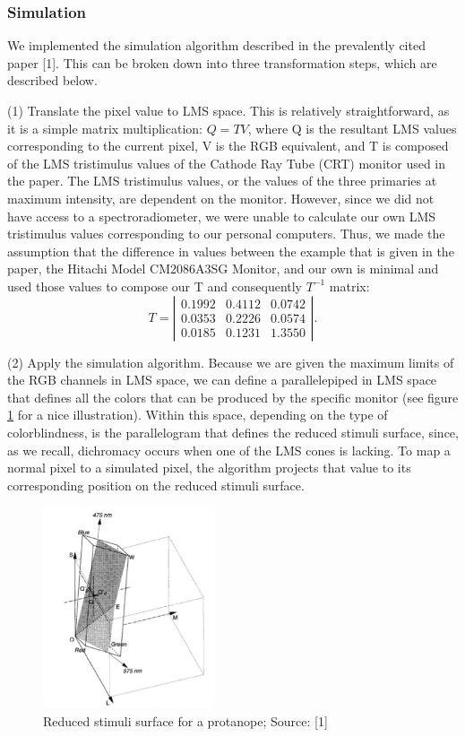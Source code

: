\documentclass[10pt,twocolumn,letterpaper]{article}
\begin{document}
\subsubsection{Simulation}

We implemented the simulation algorithm described in the prevalently cited paper [1]. This can be broken down into three transformation steps, which are described below.

(1) Translate the pixel value to LMS space. This is relatively straightforward, as it is a simple matrix multiplication: $Q = TV$, where Q is the resultant LMS values corresponding to the current pixel, V is the RGB equivalent, and T is composed of the LMS tristimulus values of the Cathode Ray Tube (CRT) monitor used in the paper. The LMS tristimulus values, or the values of the three primaries at maximum intensity, are dependent on the monitor. However, since we did not have access to a spectroradiometer, we were unable to calculate our own LMS tristimulus values corresponding to our personal computers. Thus, we made the assumption that the difference in values between the example that is given in the paper, the Hitachi Model CM2086A3SG Monitor, and our own is minimal and used those values to compose our T and consequently $T^{-1}$ matrix: 
\[ T = \left| \begin{array}{ccc}
0.1992 & 0.4112 & 0.0742 \\
0.0353 & 0.2226 & 0.0574 \\
0.0185 & 0.1231 & 1.3550 \end{array} \right|.\]

(2) 	Apply the simulation algorithm. Because we are given the maximum limits of the RGB channels in LMS space, we can define a parallelepiped in LMS space that defines all the colors that can be produced by the specific monitor (see figure \ref{fig:para} for a nice illustration).  Within this space, depending on the type of colorblindness, is the parallelogram that defines the reduced stimuli surface, since, as we recall, dichromacy occurs when one of the LMS cones is lacking. To map a normal pixel to a simulated pixel, the algorithm projects that value to its corresponding position on the reduced stimuli surface. 

\begin{figure}[h]
  \includegraphics[width=0.45\textwidth]{para.png}
  \caption{Reduced stimuli surface for a protanope; Source: [1]}
  \label{fig:para}
\end{figure}
\end{document}
